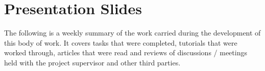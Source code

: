 \chapter{Presentation Slides}
\label{ch:slides_appendix}
The following is a weekly summary of the work carried during the development of this body of work. It covers tasks that were completed, tutorials that were worked through, articles that were read and reviews of discussions / meetings held with the project supervisor and other third parties. 




